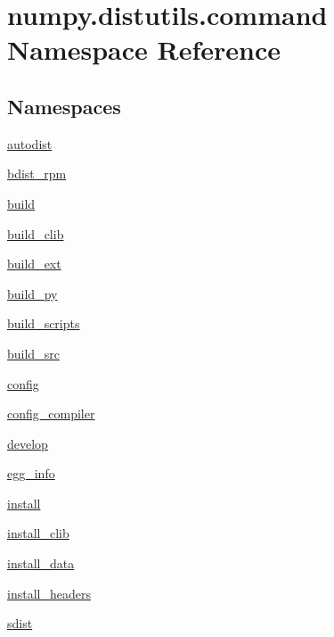 \hypertarget{namespacenumpy_1_1distutils_1_1command}{}\section{numpy.\+distutils.\+command Namespace Reference}
\label{namespacenumpy_1_1distutils_1_1command}
\subsection*{Namespaces}
\begin{DoxyCompactItemize}
\item 
 \hyperlink{namespacenumpy_1_1distutils_1_1command_1_1autodist}{autodist}
\item 
 \hyperlink{namespacenumpy_1_1distutils_1_1command_1_1bdist__rpm}{bdist\+\_\+rpm}
\item 
 \hyperlink{namespacenumpy_1_1distutils_1_1command_1_1build}{build}
\item 
 \hyperlink{namespacenumpy_1_1distutils_1_1command_1_1build__clib}{build\+\_\+clib}
\item 
 \hyperlink{namespacenumpy_1_1distutils_1_1command_1_1build__ext}{build\+\_\+ext}
\item 
 \hyperlink{namespacenumpy_1_1distutils_1_1command_1_1build__py}{build\+\_\+py}
\item 
 \hyperlink{namespacenumpy_1_1distutils_1_1command_1_1build__scripts}{build\+\_\+scripts}
\item 
 \hyperlink{namespacenumpy_1_1distutils_1_1command_1_1build__src}{build\+\_\+src}
\item 
 \hyperlink{namespacenumpy_1_1distutils_1_1command_1_1config}{config}
\item 
 \hyperlink{namespacenumpy_1_1distutils_1_1command_1_1config__compiler}{config\+\_\+compiler}
\item 
 \hyperlink{namespacenumpy_1_1distutils_1_1command_1_1develop}{develop}
\item 
 \hyperlink{namespacenumpy_1_1distutils_1_1command_1_1egg__info}{egg\+\_\+info}
\item 
 \hyperlink{namespacenumpy_1_1distutils_1_1command_1_1install}{install}
\item 
 \hyperlink{namespacenumpy_1_1distutils_1_1command_1_1install__clib}{install\+\_\+clib}
\item 
 \hyperlink{namespacenumpy_1_1distutils_1_1command_1_1install__data}{install\+\_\+data}
\item 
 \hyperlink{namespacenumpy_1_1distutils_1_1command_1_1install__headers}{install\+\_\+headers}
\item 
 \hyperlink{namespacenumpy_1_1distutils_1_1command_1_1sdist}{sdist}
\end{DoxyCompactItemize}
